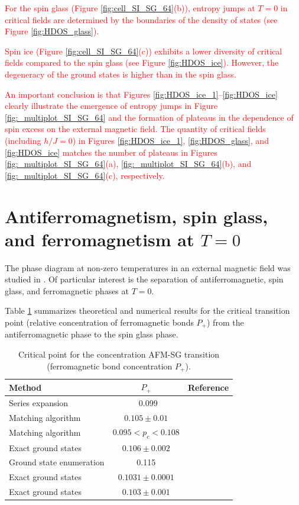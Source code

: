 \documentclass[preprint,12pt]{elsarticle}
\begin{document}
	\textcolor{red}{For the spin glass (Figure \ref{fig:cell_SI_SG_64}(b)), entropy jumps at $T = 0$ in critical fields are determined by the boundaries of the density of states (see Figure \ref{fig:HDOS_glass}).}
	
	\textcolor{red}{Spin ice (Figure \ref{fig:cell_SI_SG_64}(c)) exhibits a lower diversity of critical fields compared to the spin glass (see Figure \ref{fig:HDOS_ice}). However, the degeneracy of the ground states is higher than in the spin glass.}
	
	\textcolor{red}{An important conclusion is that Figures \ref{fig:HDOS_ice_1}–\ref{fig:HDOS_ice} clearly illustrate the emergence of entropy jumps in Figure \ref{fig:_multiplot_SI_SG_64} and the formation of plateaus in the dependence of spin excess on the external magnetic field.  
	The quantity of critical fields (including $h/J=0$) in Figures \ref{fig:HDOS_ice_1}, \ref{fig:HDOS_glass}, and \ref{fig:HDOS_ice} matches the number of plateaus in Figures \ref{fig:_multiplot_SI_SG_64}(a), \ref{fig:_multiplot_SI_SG_64}(b), and \ref{fig:_multiplot_SI_SG_64}(c), respectively.}
	
	
	\section{Antiferromagnetism, spin glass, and ferromagnetism at $T = 0$}
	
	The phase diagram at non-zero temperatures in an external magnetic field was studied in \cite{trukhin2024thermodynamic}. Of particular interest is the separation of antiferromagnetic, spin glass, and ferromagnetic phases at $T = 0$.
	
	Table \ref{tab:lit_phase} summarizes theoretical and numerical results for the critical transition point (relative concentration of ferromagnetic bonds $P_+$) from the antiferromagnetic phase to the spin glass phase.
	
	\begin{table}[!h]
		\centering
		\begin{tabular}{|l|c|l|}
			\hline
			Method & \( P_{+} \) & Reference \\ \hline
			Series expansion & ~0.099 & \cite{PhysRevB.19.260} \\ \hline
			Matching algorithm & \( 0.105 \pm 0.01 \) & \cite{H_Freund_1989} \\ \hline
			Matching algorithm & \( 0.095 < p_c < 0.108 \) & \cite{BENDISCH1994139} \\ \hline
			Exact ground states & \( 0.106 \pm 0.002 \) & \cite{N.Kawashima_1997} \\ \hline
			Ground state enumeration & 0.115 & \cite{PhysRevE.58.1502} \\ \hline
			Exact ground states & \( 0.1031 \pm 0.0001 \) & \cite{WANG200331} \\ \hline
			Exact ground states & \( 0.103 \pm 0.001 \) & \cite{amoruso2004domain} \\ \hline
		\end{tabular}
		\caption{Critical point for the concentration AFM-SG transition (ferromagnetic bond concentration $ P_+ $).}
		\label{tab:lit_phase}
	\end{table}
	
\end{document}
